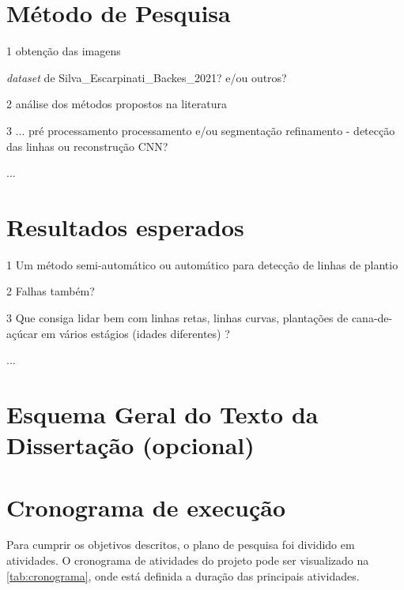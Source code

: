 \documentclass[12pt, a4paper, english, brazil]{article}
\newcommand{\textBlue}[1]{{{\color{blue} #1}}}
\begin{document}
\section{Método de Pesquisa}

\textBlue{
1 obtenção das imagens

    \textit{dataset} de Silva\_Escarpinati\_Backes\_2021? e/ou outros?

2 análise dos métodos propostos na literatura

3 ...
    pré processamento
    processamento e/ou segmentação
    refinamento - detecção das linhas ou reconstrução
    CNN?

...
}

\section{Resultados esperados}

\textBlue{
1 Um método semi-automático ou automático para detecção de linhas de plantio

2 Falhas também?

3 Que consiga lidar bem com linhas retas, linhas curvas, plantações de cana-de-açúcar em vários estágios (idades diferentes) ?

...
}

\section{Esquema Geral do Texto da Dissertação (opcional)}

\section{Cronograma de execução}

Para cumprir os objetivos descritos, o plano de pesquisa foi dividido em atividades. O cronograma de atividades do projeto pode ser visualizado na \autoref{tab:cronograma}, onde está definida a
duração das principais atividades.
\end{document}
